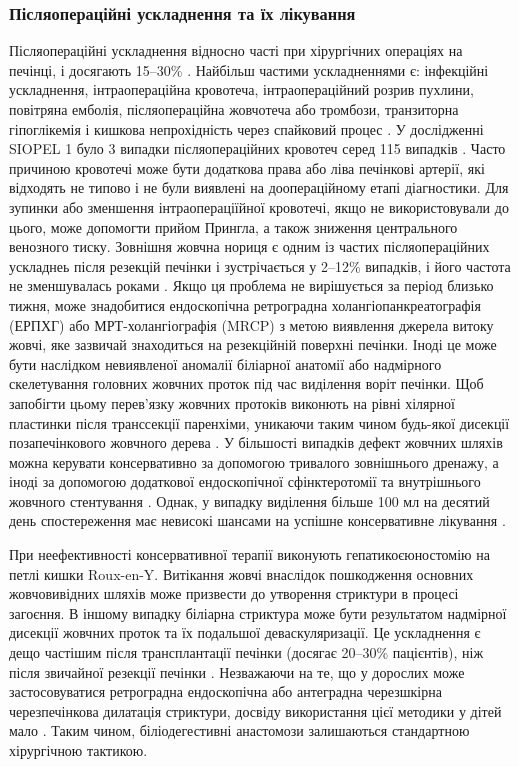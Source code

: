 \subsubsection{Післяопераційні ускладнення та їх лікування}
Післяопераційні ускладнення відносно часті при хірургічних операціях на печінці, і досягають 15–30\% \cite{pmid9149752}. Найбільш частими ускладненнями є: інфекційні ускладнення, інтраопераційна кровотеча, інтраопераційний розрив пухлини, повітряна емболія, післяопераційна жовчотеча або тромбози, транзиторна гіпоглікемія і кишкова непрохідність через спайковий процес \cite{pmid9494762}.
У дослідженні SIOPEL 1 було 3 випадки післяопераційних кровотеч серед 115 випадків \cite{pmid9591340}. Часто причиною кровотечі може бути додаткова права або ліва печінкові артерії, які відходять не типово і не були виявлені на доопераційному етапі діагностики. Для зупинки або зменшення інтраопераціїйної кровотечі, якщо не використовували до цього, може допомогти прийом Прингла, а також зниження центрального венозного тиску.
Зовнішня жовчна нориця є одним із частих післяопераційних ускладнеь після резекцій печінки і зустрічається у 2–12\% випадків, і його частота не зменшувалась роками \cite{pmid29888545}. Якщо ця проблема не вирішується за період близько тижня, може знадобитися ендоскопічна ретроградна холангіопанкреатографія (ЕРПХГ) або МРТ-холангіографія (MRCP) з метою виявлення джерела витоку жовчі, яке зазвичай знаходиться на резекційній поверхні печінки. Іноді це може бути наслідком невиявленої аномалії біліарної анатомії або надмірного скелетування головних жовчних проток під час виділення воріт печінки. Щоб запобігти цьому перев'язку жовчних протоків виконють на рівні хілярної пластинки після транссекції паренхіми, уникаючи таким чином будь-якої дисекції позапечінкового жовчного дерева \cite{pmid24759227}. У більшості випадків дефект жовчних шляхів можна керувати консервативно за допомогою тривалого зовнішнього дренажу, а іноді за допомогою додаткової ендоскопічної сфінктеротомії та внутрішнього жовчного стентування \cite{pmid16404555}. Однак, у випадку виділення більше 100 мл на десятий день спостереження має невисокі шансами на успішне консервативне лікування \cite{pmid15285242}. 

При неефективності консервативної терапії виконують гепатикоєюностомію на петлі кишки Roux-en-Y. Витікання жовчі внаслідок пошкодження основних жовчовивідних шляхів може призвести до утворення стриктури в процесі загоєння. В іншому випадку біліарна стриктура може бути результатом надмірної дисекції жовчних проток та їх подальшої деваскуляризації. Це ускладнення є дещо частішим після трансплантації печінки (досягає 20–30\% пацієнтів), ніж після звичайної резекції печінки \cite{pmid16123986}. Незважаючи на те, що у дорослих може застосовуватися ретроградна ендоскопічна або антеградна черезшкірна черезпечінкова дилатація стриктури, досвіду використання цієї методики у дітей мало \cite{pmid12115331}. Таким чином, біліодегестивні анастомози залишаються стандартною хірургічною тактикою.

